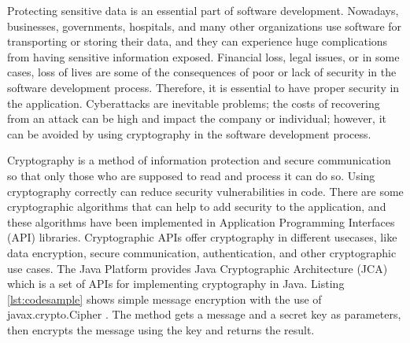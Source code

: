 Protecting sensitive data is an essential part of software development. Nowadays, businesses, governments, hospitals, and many other organizations use software for transporting or storing their data, and they can experience huge complications from having sensitive information exposed. Financial loss, legal issues, or in some cases, loss of lives are some of the consequences of poor or lack of security in the software development process. Therefore, it is essential to have proper security in the application. Cyberattacks are inevitable problems; the costs of recovering from an attack can be high and impact the company or individual; however, it can be avoided by using cryptography in the software development process.

Cryptography is a method of information protection and secure communication so that only those who are supposed to read and process it can do so. Using cryptography correctly can reduce security vulnerabilities in code. There are some cryptographic algorithms that can help to add security to the application, and these algorithms have been implemented in Application Programming Interfaces (API) libraries. Cryptographic APIs offer cryptography in different usecases, like data encryption, secure communication, authentication, and other cryptographic use cases. The Java Platform provides Java Cryptographic Architecture (JCA) \cite{jca} which is a set of APIs for implementing cryptography in Java. Listing \ref{lst:codesample} shows simple message encryption with the use of javax.crypto.Cipher \cite{cipher}. The method gets a message and a secret key as parameters, then encrypts the message using the key and returns the result.

